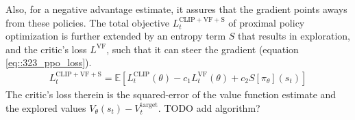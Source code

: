 Also, for a negative advantage estimate, it assures that the gradient points aways from these policies. The total objective $L_t^{\text{CLIP}+\text{VF}+\text{S}}$ of proximal policy optimization is further extended by an entropy term $S$ that results in exploration, and the critic's loss $L^\text{VF}$, such that it can steer the gradient (equation \ref{eq::323_ppo_loss}).
\begin{align}
	L_t^{\text{CLIP}+\text{VF}+\text{S}} = \mathbb{E}\left[L_t^\text{CLIP}(\theta)-c_1L_t^\text{VF}(\theta)+c_2S\left[\pi_\theta\right](s_t)\right]
	\label{eq::323_ppo_loss}
\end{align}
The critic's loss therein is the squared-error of the value function estimate and the explored values $V_\theta(s_t)-V^\text{target}_t$.
TODO add algorithm?
